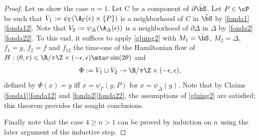 \begin{proof}
Let us show the case $n=1$. Let C be a component of $\partial \hat \bS$.
Let $P\in \cP$ be such that $V_1:=\psi_\Gamma(\A_\Gamma(\epsilon) \times \{P\})$ is a neighborhood of $C$ in $\hat \bS$ by \cref{fonda1}\eqref{fonda12}. Note that $V_2:= \psi_\Delta(\A_\Delta(\epsilon))$ is a neighborhood of $\partial \Delta $ in $\Delta$ by \cref{fonda2}\eqref{fonda22}.
To this end, it suffices to apply \cref{gluing2} with $M_1=\hat \bS$, $M_2= \Delta$, $f_1= g$, $f_2= f$ and $f_{12}$ the time-one of the Hamiltonian flow of $H: (\theta,r)\in \R/\pi \Z\times (-\epsilon, \epsilon)\mto r\sin(2\theta)$ and
\[\Phi:= V_1\sqcup V_2\to \R/\pi \Z\times (-\epsilon, \epsilon),\]
defined by $\Phi(x)=y$ iff $x= \psi_\Gamma(y,P)$ for $x=\psi_\Delta(y)$.
Note that by Claims \ref{fonda1}\eqref{fonda12} and \ref{fonda2}\eqref{fonda22}, the assumptions of \cref{gluing2} are satisfied; this theorem provides the sought conclusions.

Finally note that the case $4\ge n>1$ can be proved by induction on $n$ using the later argument of the inductive step.
\end{proof}

